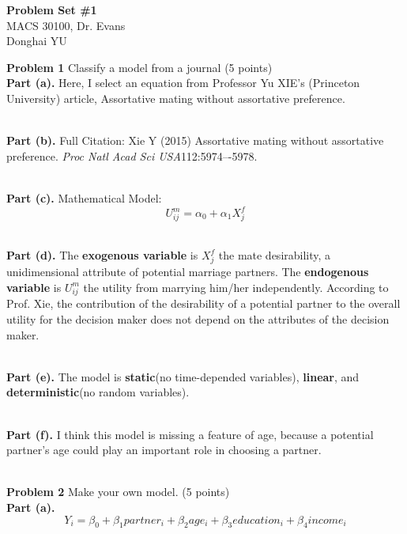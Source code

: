 \documentclass[letterpaper,12pt]{article}
\theoremstyle{definition}
\begin{document}
\begin{flushleft}
  \textbf{\large{Problem Set \#1}} \\
  MACS 30100, Dr. Evans \\
  Donghai YU
\end{flushleft}

\vspace{5mm}

\noindent\textbf{Problem 1} Classify a model from a journal (5 points)
\noindent\\\textbf{Part (a).} 
Here, I select an equation from Professor Yu XIE's (Princeton University) article, Assortative mating without assortative preference.

\noindent\\\textbf{Part (b).} Full Citation: Xie Y (2015) Assortative mating without assortative preference. \textit{Proc Natl Acad Sci USA}112:5974–-5978.

\noindent\\\textbf{Part (c).} Mathematical Model:
\begin{equation*}
  U_{ij}^{m} = \alpha_{0} + \alpha_{1}X_{j}^{f}
\end{equation*}

\noindent\\\textbf{Part (d).} The \textbf{exogenous variable} is $X_{j}^{f}$ the mate desirability, a unidimensional attribute of potential marriage partners. The \textbf{endogenous variable} is $U_{ij}^{m}$ the utility from marrying him/her independently. According to Prof. Xie, the contribution of the desirability of a potential partner to the overall utility for the decision maker does not depend on the attributes of the decision maker. 

\noindent\\\textbf{Part (e).} The model is \textbf{static}(no time-depended variables), \textbf{linear}, and \textbf{deterministic}(no random variables). 

\noindent\\\textbf{Part (f).} I think this model is missing a feature of age, because a potential partner's age could play an important role in choosing a partner.  

\pagebreak
\noindent\\\textbf{Problem 2} Make your own model. (5 points)
\noindent\\\textbf{Part (a).} 
\begin{equation*}
  Y_{i} = \beta_{0} + \beta_{1}partner_{i} + \beta_{2}age_{i} + \beta_{3}education_{i} + \beta_{4}income_{i}
\end{equation*}
\end{document}
